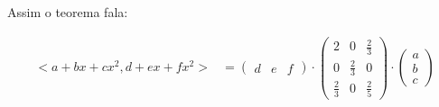 \documentclass{article}
\begin{document}
        Assim o teorema fala:

        \begin{align*}
            <a + bx + cx^2, d + ex + fx^2> &= \begin{pmatrix}d&e&f\end{pmatrix} \cdot 
            \begin{pmatrix}
                2 & 0 & \frac{2}{3}\\
                0 & \frac{2}{3} & 0\\
                \frac{2}{3} & 0 & \frac{2}{5}
            \end{pmatrix}
            \cdot
            \begin{pmatrix}
                a\\b\\c
            \end{pmatrix}
        \end{align*}
\end{document}
